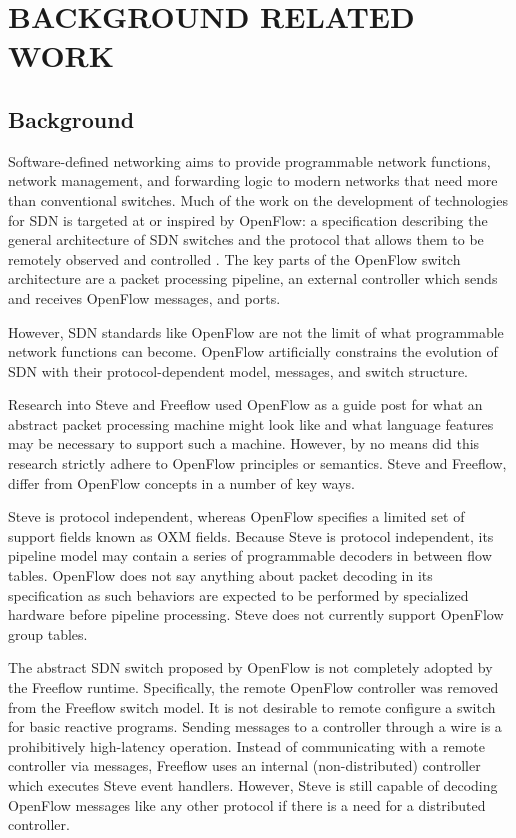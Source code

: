 \chapter{BACKGROUND RELATED WORK}
\label{ch:related}

\section{Background}
\label{rel:openflow}

Software-defined networking aims to provide programmable network functions,
network management, and forwarding logic to modern networks that need more
than conventional switches.
Much of the work on the development of technologies for SDN is targeted at or 
inspired by OpenFlow: a specification describing the general architecture of SDN 
switches and the protocol that allows them to be remotely observed and controlled 
\cite{openflow_spec}. The key parts of the OpenFlow switch architecture are a packet 
processing pipeline, an external controller which sends and receives
OpenFlow messages, and ports.

However, SDN standards like OpenFlow are not the limit of what programmable
network functions can become. OpenFlow artificially constrains the evolution
of SDN with their protocol-dependent model, messages, and switch structure.

Research into Steve and Freeflow used OpenFlow as a guide post for what an abstract
packet processing machine might look like and what language features may be
necessary to support such a machine. However, by no means did this research
strictly adhere to OpenFlow principles or semantics.
Steve and Freeflow, differ from OpenFlow concepts in a number of key ways.

Steve is protocol independent, whereas OpenFlow specifies a limited set of
support fields known as OXM fields.
Because Steve is protocol independent, its
pipeline model may contain a series of programmable decoders in between flow tables. 
OpenFlow does not say anything about packet decoding in its
specification as such behaviors are expected to be performed by specialized hardware
before pipeline processing. 
Steve does not currently support OpenFlow group tables.

The abstract SDN switch proposed by OpenFlow is not completely adopted by
the Freeflow runtime. Specifically, the remote OpenFlow controller was
removed from the Freeflow switch model. It is not desirable to remote configure
a switch for basic reactive programs. Sending messages to a controller through
a wire is a prohibitively high-latency operation.
Instead of communicating with a remote controller via messages, Freeflow uses an 
internal (non-distributed) controller which executes Steve event handlers. 
However, Steve is still capable of decoding OpenFlow messages like any other protocol
if there is a need for a distributed controller.

